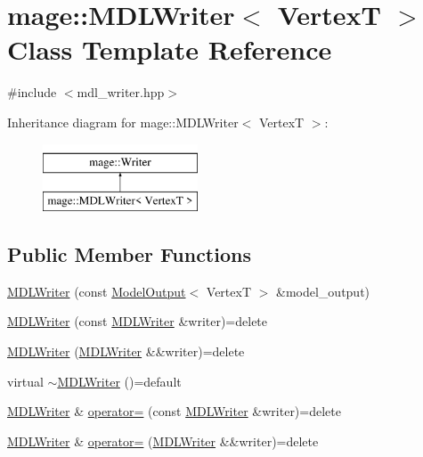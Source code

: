 \hypertarget{classmage_1_1_m_d_l_writer}{}\section{mage\+:\+:M\+D\+L\+Writer$<$ VertexT $>$ Class Template Reference}
\label{classmage_1_1_m_d_l_writer}


{\ttfamily \#include $<$mdl\+\_\+writer.\+hpp$>$}

Inheritance diagram for mage\+:\+:M\+D\+L\+Writer$<$ VertexT $>$\+:\begin{figure}[H]
\begin{center}
\leavevmode
\includegraphics[height=2.000000cm]{classmage_1_1_m_d_l_writer}
\end{center}
\end{figure}
\subsection*{Public Member Functions}
\begin{DoxyCompactItemize}
\item 
\hyperlink{classmage_1_1_m_d_l_writer_a7e5c6c9c9a9d32b09c5e17f4691e01c1}{M\+D\+L\+Writer} (const \hyperlink{structmage_1_1_model_output}{Model\+Output}$<$ VertexT $>$ \&model\+\_\+output)
\item 
\hyperlink{classmage_1_1_m_d_l_writer_ad244168d68c45fe7dcafa350c8a13fbe}{M\+D\+L\+Writer} (const \hyperlink{classmage_1_1_m_d_l_writer}{M\+D\+L\+Writer} \&writer)=delete
\item 
\hyperlink{classmage_1_1_m_d_l_writer_acf2751035dfd4cca9884e6162830c5f5}{M\+D\+L\+Writer} (\hyperlink{classmage_1_1_m_d_l_writer}{M\+D\+L\+Writer} \&\&writer)=delete
\item 
virtual \hyperlink{classmage_1_1_m_d_l_writer_adcb78b5d8ac0d665f3bae0b643cd6932}{$\sim$\+M\+D\+L\+Writer} ()=default
\item 
\hyperlink{classmage_1_1_m_d_l_writer}{M\+D\+L\+Writer} \& \hyperlink{classmage_1_1_m_d_l_writer_ac8f4db1bc43a8fe4842409671505b49b}{operator=} (const \hyperlink{classmage_1_1_m_d_l_writer}{M\+D\+L\+Writer} \&writer)=delete
\item 
\hyperlink{classmage_1_1_m_d_l_writer}{M\+D\+L\+Writer} \& \hyperlink{classmage_1_1_m_d_l_writer_ac5c21784110691e24d84d6c241a2e5f6}{operator=} (\hyperlink{classmage_1_1_m_d_l_writer}{M\+D\+L\+Writer} \&\&writer)=delete
\end{DoxyCompactItemize}

